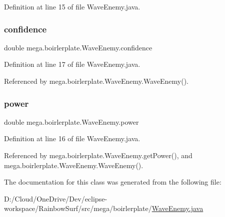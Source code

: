 Definition at line 15 of file Wave\+Enemy.\+java.

\mbox{\label{classmega_1_1boirlerplate_1_1_wave_enemy_a40ee79e9eb970f417776521d89a64c82}} 
\subsubsection{\texorpdfstring{confidence}{confidence}}
{\footnotesize\ttfamily double mega.\+boirlerplate.\+Wave\+Enemy.\+confidence\hspace{0.3cm}{\ttfamily [private]}}



Definition at line 17 of file Wave\+Enemy.\+java.



Referenced by mega.\+boirlerplate.\+Wave\+Enemy.\+Wave\+Enemy().

\mbox{\label{classmega_1_1boirlerplate_1_1_wave_enemy_a64bdfd045bdda668cebc13d1c53c8efc}} 
\subsubsection{\texorpdfstring{power}{power}}
{\footnotesize\ttfamily double mega.\+boirlerplate.\+Wave\+Enemy.\+power\hspace{0.3cm}{\ttfamily [private]}}



Definition at line 16 of file Wave\+Enemy.\+java.



Referenced by mega.\+boirlerplate.\+Wave\+Enemy.\+get\+Power(), and mega.\+boirlerplate.\+Wave\+Enemy.\+Wave\+Enemy().



The documentation for this class was generated from the following file\+:\begin{DoxyCompactItemize}
\item 
D\+:/\+Cloud/\+One\+Drive/\+Dev/eclipse-\/workspace/\+Rainbow\+Surf/src/mega/boirlerplate/\hyperlink{_wave_enemy_8java}{Wave\+Enemy.\+java}\end{DoxyCompactItemize}
